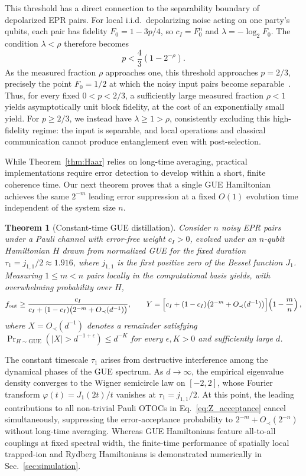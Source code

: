 \documentclass[onecolumn,prx,longbibliography,nofootinbib, superscriptaddress]{revtex4-2}
\newtheorem{theorem}{Theorem}
\theoremstyle{recap}
\begin{document}
This threshold has a direct connection to the separability boundary of depolarized EPR pairs. For local i.i.d.\ depolarizing noise acting on one party's qubits, each pair has fidelity $F_0=1-3p/4$, so $c_I=F_0^n$ and $\lambda=-\log_2 F_0$. The condition $\lambda<\rho$ therefore becomes
\begin{equation}
    p<\frac{4}{3}\left(1-2^{-\rho}\right).
\end{equation}
As the measured fraction $\rho$ approaches one, this threshold approaches $p=2/3$, precisely the point $F_0=1/2$ at which the noisy input pairs become separable~\cite{BDSW}. Thus, for every fixed $0<p<2/3$, a sufficiently large measured fraction $\rho<1$ yields asymptotically unit block fidelity, at the cost of an exponentially small yield. For $p\geq2/3$, we instead have $\lambda\geq1>\rho$, consistently excluding this high-fidelity regime: the input is separable, and local operations and classical communication cannot produce entanglement even with post-selection.

While Theorem~\ref{thm:Haar} relies on long-time averaging, practical implementations require error detection to develop within a short, finite coherence time. Our next theorem proves that a single GUE Hamiltonian achieves the same $2^{-m}$ leading error suppression at a fixed $O(1)$ evolution time independent of the system size $n$.

\begin{theorem}[Constant-time GUE distillation]\label{thm:O1}
    Consider $n$ noisy EPR pairs under a Pauli channel with error-free weight $c_I>0$, evolved under an $n$-qubit Hamiltonian $H$ drawn from normalized GUE for the fixed duration $\tau_1=j_{1,1}/2\approx 1.916$, where $j_{1,1}$ is the first positive zero of the Bessel function $J_1$. Measuring $1\leq m<n$ pairs locally in the computational basis yields, with overwhelming probability over $H$,
    \begin{equation}\label{eq:thm3_main}
        f_{\mathrm{out}}
        \geq\frac{c_I}{c_I+(1-c_I)\bigl(2^{-m}+O_{\prec}(d^{-1})\bigr)},\qquad
        Y
        =\Bigl[c_I+(1-c_I)\bigl(2^{-m}+O_{\prec}(d^{-1})\bigr)\Bigr]\!\left(1-\frac{m}{n}\right),
    \end{equation}
    where $X=O_{\prec}(d^{-1})$ denotes a remainder satisfying $\Pr_{H\sim\mathrm{GUE}}(|X|>d^{-1+\epsilon})\leq d^{-K}$ for every $\epsilon,K>0$ and sufficiently large $d$.
\end{theorem}

The constant timescale $\tau_1$ arises from destructive interference among the dynamical phases of the GUE spectrum. As $d\to\infty$, the empirical eigenvalue density converges to the Wigner semicircle law on $[-2,2]$, whose Fourier transform $\varphi(t)=J_1(2t)/t$ vanishes at $\tau_1=j_{1,1}/2$. At this point, the leading contributions to all non-trivial Pauli OTOCs in Eq.~\eqref{eq:Z_acceptance} cancel simultaneously, suppressing the error-acceptance probability to $2^{-m}+O_{\prec}(2^{-n})$ without long-time averaging. Whereas GUE Hamiltonians feature all-to-all couplings at fixed spectral width, the finite-time performance of spatially local trapped-ion and Rydberg Hamiltonians is demonstrated numerically in Sec.~\ref{sec:simulation}.
\end{document}
